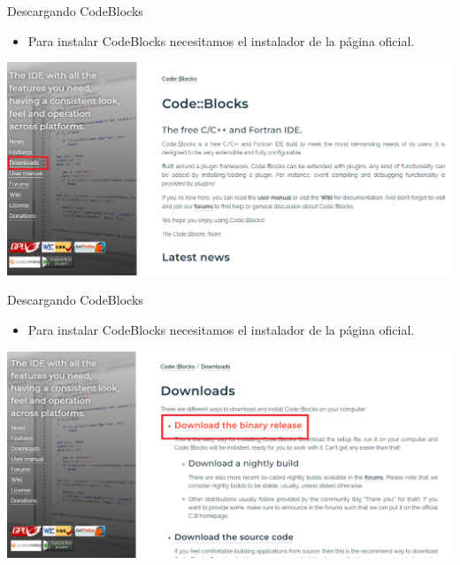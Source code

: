 \documentclass[11pt]{beamer}
\begin{document}
\begin{frame}{Descargando CodeBlocks}
    \justifying
\begin{itemize}
    \item Para instalar CodeBlocks necesitamos el instalador de la página oficial.
\end{itemize}
    \includegraphics[width=\textwidth]{cb2.png}
\end{frame}

\begin{frame}{Descargando CodeBlocks}
    \justifying
\begin{itemize}
    \item Para instalar CodeBlocks necesitamos el instalador de la página oficial.
\end{itemize}
    \includegraphics[width=\textwidth]{cb4.png}
\end{frame}
\end{document}

